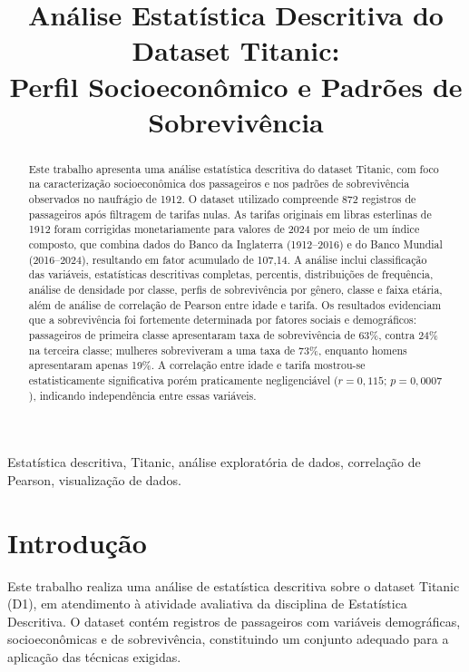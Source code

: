 \documentclass[conference]{IEEEtran}
\title{Análise Estatística Descritiva do Dataset Titanic:\\
Perfil Socioeconômico e Padrões de Sobrevivência}
\author{
  \IEEEauthorblockN{Heitor Teixeira - 2651254}
  \IEEEauthorblockA{
    \textit{MBA: Ciência de dados}\\
    UNIFOR\\
    Fortaleza, Brasil\\
    heitor.mba.unifor@gmail.com
  }
}
\begin{document}
\maketitle

\begin{abstract}
Este trabalho apresenta uma análise estatística descritiva do dataset
Titanic, com foco na caracterização socioeconômica dos passageiros e nos
padrões de sobrevivência observados no naufrágio de 1912. O dataset
utilizado compreende 872 registros de passageiros após filtragem de tarifas
nulas. As tarifas originais em libras esterlinas de 1912 foram corrigidas
monetariamente para valores de 2024 por meio de um índice composto, que
combina dados do Banco da Inglaterra (1912--2016) e do Banco Mundial
(2016--2024), resultando em fator acumulado de 107,14. A análise inclui
classificação das variáveis, estatísticas descritivas completas, percentis,
distribuições de frequência, análise de densidade por classe, perfis de
sobrevivência por gênero, classe e faixa etária, além de análise de
correlação de Pearson entre idade e tarifa. Os resultados evidenciam que a
sobrevivência foi fortemente determinada por fatores sociais e demográficos:
passageiros de primeira classe apresentaram taxa de sobrevivência de 63\%,
contra 24\% na terceira classe; mulheres sobreviveram a uma taxa de 73\%,
enquanto homens apresentaram apenas 19\%. A correlação entre idade e tarifa
mostrou-se estatisticamente significativa porém praticamente negligenciável
($r = 0{,}115$; $p = 0{,}0007$), indicando independência entre essas
variáveis.
\end{abstract}

\begin{IEEEkeywords}
Estatística descritiva, Titanic, análise exploratória de dados,
correlação de Pearson, visualização de dados.
\end{IEEEkeywords}

\section{Introdução}

Este trabalho realiza uma análise de estatística descritiva sobre o dataset
Titanic (D1), em atendimento à atividade avaliativa da disciplina de
Estatística Descritiva. O dataset contém registros de passageiros com
variáveis demográficas, socioeconômicas e de sobrevivência, constituindo
um conjunto adequado para a aplicação das técnicas exigidas.
\end{document}
